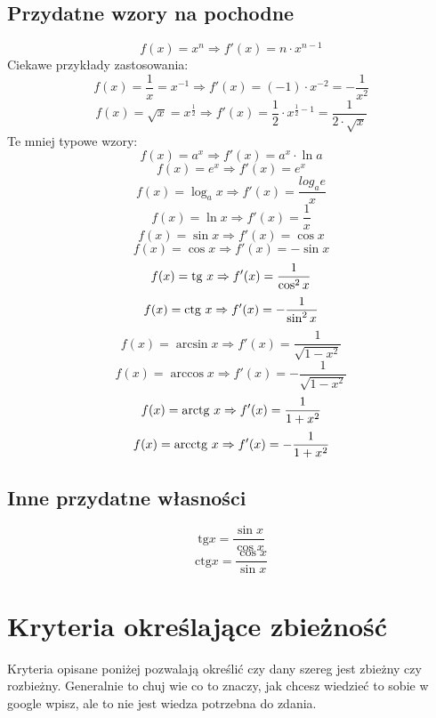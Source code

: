 \documentclass[11pt]{article}
\begin{document}
\subsection{Przydatne wzory na pochodne}
\vbox{
    \[
        f(x)=x^n \Rightarrow f'(x)=n \cdot x^{n-1}
    \]
    Ciekawe przykłady zastosowania:
    \[
        f(x)=\frac{1}{x}=x^{-1} \Rightarrow f'(x) = (-1) \cdot x^{-2} = -\frac{1}{x^2}
    \]
    \[
        f(x)= \sqrt{x} = x^{\frac{1}{2}} \Rightarrow f'(x) = \frac{1}{2} \cdot x^{\frac{1}{2} - 1} 
        = \frac{1}{2 \cdot \sqrt{x}}
    \]
    Te mniej typowe wzory:
    \[
        f(x)=a^x \Rightarrow f'(x)=a^x \cdot \ln a
    \]
    \[
        f(x)=e^x \Rightarrow f'(x)=e^x
    \]
    \[
        f(x)=\log_{a}x \Rightarrow f'(x)= \frac{log_{a}e}{x}
    \]
    \[
        f(x)=\ln x \Rightarrow f'(x)=\frac{1}{x}
    \]
    \[
        f(x)=\sin x \Rightarrow f'(x)=\cos x
    \]
    \[
        f(x)=\cos x \Rightarrow f'(x)=-\sin x
    \]
    \[
        f(x)=\text{tg\space}x \Rightarrow f'(x)=\frac{1}{\cos^2 x}
    \]
    \[
        f(x)=\text{ctg\space}x \Rightarrow f'(x)=-\frac{1}{\sin^2 x}
    \]
    \[
        f(x)=\arcsin x \Rightarrow f'(x)=\frac{1}{\sqrt{1-x^2}}
    \]
    \[
        f(x)=\arccos x \Rightarrow f'(x)=-\frac{1}{\sqrt{1-x^2}}
    \]
    \[
        f(x)=\text{arctg\space} x \Rightarrow f'(x)=\frac{1}{1+x^2}
    \]
    \[
        f(x)=\text{arcctg\space} x \Rightarrow f'(x)=-\frac{1}{1+x^2}
    \]
}

\subsection{Inne przydatne własności}
\vbox{
    \[
        \text{tg}x = \frac{\sin x}{\cos x}
    \]
    \[
        \text{ctg}x = \frac{\cos x}{\sin x}
    \]
}

\section{Kryteria określające zbieżność}
\vbox{
    Kryteria opisane poniżej pozwalają określić czy dany szereg
    jest zbieżny czy rozbieżny. Generalnie to chuj wie co to znaczy,
    jak chcesz wiedzieć to sobie w google wpisz, ale to nie jest wiedza
    potrzebna do zdania.
}
\end{document}

